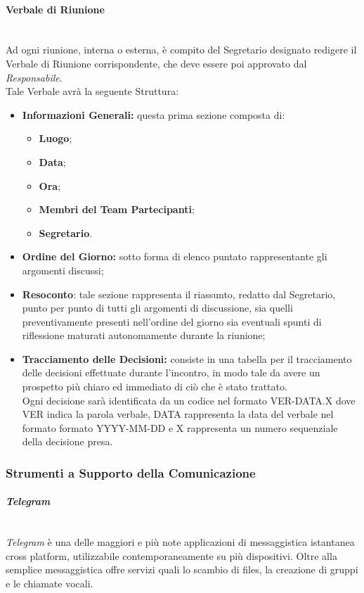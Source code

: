 \paragraph{Verbale di Riunione} ~\\
\label{VdR}
	Ad ogni riunione, interna o esterna, è compito del Segretario designato redigere il Verbale di Riunione 							corrispondente, che deve essere poi approvato dal \textit{Responsabile}.\\
	Tale Verbale avrà la seguente Struttura:
	\begin{itemize}
	\item \textbf{Informazioni Generali:} questa prima sezione composta di:
		\begin{itemize}
		\item \textbf{Luogo};
		\item \textbf{Data};
		\item \textbf{Ora};
		\item \textbf{Membri del Team Partecipanti};
		\item \textbf{Segretario}.
		\end{itemize}
	\item \textbf{Ordine del Giorno:} sotto forma di elenco puntato rappresentante gli argomenti discussi;
	\item \textbf{Resoconto}: tale sezione rappresenta il riassunto, redatto dal Segretario, punto per punto di tutti 		gli argomenti di discussione, sia quelli preventivamente presenti nell'ordine del giorno sia eventuali spunti 				di riflessione maturati autonomamente durante la riunione;
	\item \textbf{Tracciamento delle Decisioni:} consiste in una tabella per il tracciamento delle decisioni effettuate durante l'incontro, in modo tale da avere un prospetto più chiaro ed immediato di ciò che è stato trattato. \\
	Ogni decisione sarà identificata da un codice nel formato VER-DATA.X dove VER indica la parola verbale, DATA rappresenta la data del verbale nel formato formato YYYY-MM-DD e X rappresenta un numero sequenziale della decisione presa.
	\end{itemize}
	
	
\subsubsection{Strumenti a Supporto della Comunicazione}\label{StrumentiComunicazione}

\paragraph{\textit{Telegram}} ~\\
	\textit{Telegram} è una delle maggiori e più note applicazioni di messaggistica istantanea cross platform, 					utilizzabile contemporaneamente su più dispositivi. Oltre alla semplice messaggistica offre servizi quali lo 				scambio di files, la creazione di gruppi e le chiamate vocali.

